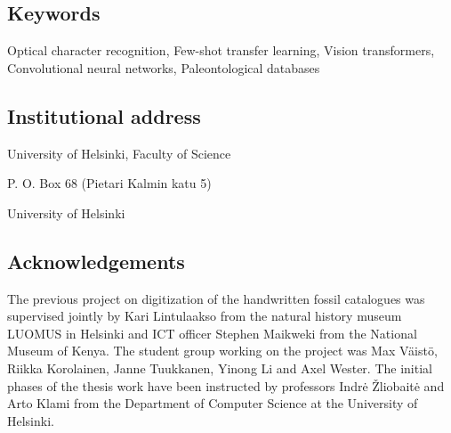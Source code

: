 \documentclass{article}
\begin{document}

\subsection*{Keywords}
Optical character recognition,
Few-shot transfer learning,
Vision transformers,
Convolutional neural networks,
Paleontological databases

\subsection*{Institutional address}

University of Helsinki, Faculty of Science

\noindent P. O. Box 68 (Pietari Kalmin katu 5)

 University of Helsinki

\subsection*{Acknowledgements}

The previous project on digitization of 
the handwritten fossil catalogues was supervised jointly by Kari Lintulaakso from the natural history museum LUOMUS 
in Helsinki and ICT officer Stephen Maikweki from the National Museum of Kenya.
The student group working on the project was Max Väistö, Riikka Korolainen, Janne Tuukkanen, Yinong Li and Axel Wester.
The initial phases of the thesis work have been instructed by professors Indrė Žliobaitė and Arto Klami from the Department 
of Computer Science at the University of Helsinki.
\end{document}
